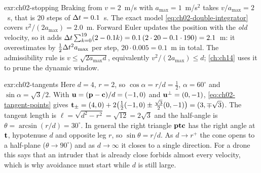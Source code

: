 \begin{solution}{exr:ch02-stopping}
Braking from $v=2$~m/s with $a_{\max}=1$~m/s$^2$ takes $v/a_{\max}=2$~s, that is $20$ steps of $\Delta t=0.1$~s. The exact model \cref{eq:ch02-double-integrator} covers $v^2/(2a_{\max})=2.0$~m. Forward Euler updates the position with the \emph{old} velocity, so it adds $\Delta t\sum_{k=0}^{19}(2-0.1k)=0.1\,(2\cdot20-0.1\cdot190)=2.1$~m: it overestimates by $\tfrac12\Delta t^2 a_{\max}$ per step, $20\cdot0.005=0.1$~m in total. The admissibility rule is $v\le\sqrt{2a_{\max}d}$, equivalently $v^2/(2a_{\max})\le d$; \cref{ch:ch14} uses it to prune the dynamic window.
\end{solution}

\begin{solution}{exr:ch02-tangents}
Here $d=4$, $r=2$, so $\cos\alpha=r/d=\tfrac12$, $\alpha=60^\circ$ and $\sin\alpha=\sqrt3/2$. With $\mathbf{u}=(\mathbf{p}-\mathbf{c})/d=(-1,0)$ and $\mathbf{u}^{\perp}=(0,-1)$, \cref{eq:ch02-tangent-points} gives $\mathbf{t}_{\pm}=(4,0)+2\bigl(\tfrac12(-1,0)\pm\tfrac{\sqrt3}{2}(0,-1)\bigr)=(3,\mp\sqrt3)$. The tangent length is $\ell=\sqrt{d^2-r^2}=\sqrt{12}=2\sqrt3$ and the half-angle is $\theta=\arcsin(r/d)=30^\circ$. In general the right triangle $\mathbf{p}\mathbf{t}\mathbf{c}$ has the right angle at $\mathbf{t}$, hypotenuse $d$ and opposite leg $r$, so $\sin\theta=r/d$. As $d\to r^{+}$ the cone opens to a half-plane ($\theta\to90^\circ$) and as $d\to\infty$ it closes to a single direction. For a drone this says that an intruder that is already close forbids almost every velocity, which is why avoidance must start while $d$ is still large.
\end{solution}

